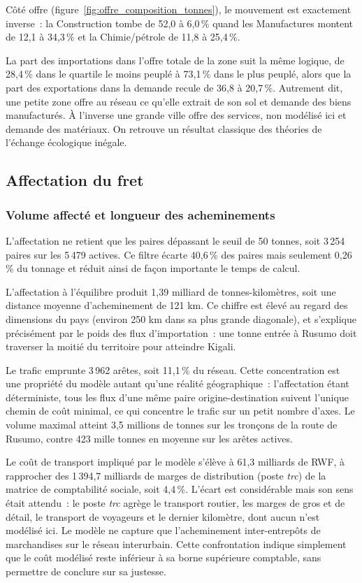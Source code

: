 \documentclass[12pt,a4paper,french]{report}
\begin{document}
	Côté offre (figure~\ref{fig:offre_composition_tonnes}), le mouvement est exactement inverse~: la Construction tombe de 52,0 à 6,0\,\% quand les Manufactures montent de 12,1 à 34,3\,\% et la Chimie/pétrole de 11,8 à 25,4\,\%. 
	
	La part des importations dans l'offre totale de la zone suit la même logique, de 28,4\,\% dans le quartile le moins peuplé à 73,1\,\% dans le plus peuplé, alors que la part des exportations dans la demande recule de 36,8 à 20,7\,\%. Autrement dit, une petite zone offre au réseau ce qu'elle extrait de son sol et demande des biens manufacturés. À l'inverse une grande ville offre des services, non modélisé ici et demande des matériaux. On retrouve un résultat classique des théories de l'échange écologique inégale.

	\subsection{Affectation du fret}
	\label{subsec:affectation_ref}

	\subsubsection{Volume affecté et longueur des acheminements}

	L'affectation ne retient que les paires dépassant le seuil de 50 tonnes, soit 3\,254 paires sur les 5\,479 actives. Ce filtre écarte 40,6\,\% des paires mais seulement 0,26\,\% du tonnage et réduit ainsi de façon importante le temps de calcul.

	L'affectation à l'équilibre produit 1,39 milliard de tonnes-kilomètres, soit une distance moyenne d'acheminement de 121 km. Ce chiffre est élevé au regard des dimensions du pays (environ 250 km dans sa plus grande diagonale), et s'explique précisément par le poids des flux d'importation~: une tonne entrée à Rusumo doit traverser la moitié du territoire pour atteindre Kigali.

	Le trafic emprunte 3\,962 arêtes, soit 11,1\,\% du réseau. Cette concentration est une propriété du modèle autant qu'une réalité géographique~: l'affectation étant déterministe, tous les flux d'une même paire origine-destination suivent l'unique chemin de coût minimal, ce qui concentre le trafic sur un petit nombre d'axes. Le volume maximal atteint 3,5 millions de tonnes sur les tronçons de la route de Rusumo, contre 423 mille tonnes en moyenne sur les arêtes actives.
	
	Le coût de transport impliqué par le modèle s'élève à 61,3 milliards de RWF, à rapprocher des 1\,394,7 milliards de marges de distribution (poste \textit{trc}) de la matrice de comptabilité sociale, soit 4,4\,\%. L'écart est considérable mais son sens était attendu~: le poste \textit{trc} agrège le transport routier, les marges de gros et de détail, le transport de voyageurs et le dernier kilomètre, dont aucun n'est modélisé ici. Le modèle ne capture que l'acheminement inter-entrepôts de marchandises sur le réseau interurbain. Cette confrontation indique simplement que le coût modélisé reste inférieur à sa borne supérieure comptable, sans permettre de conclure sur sa justesse.
\end{document}
